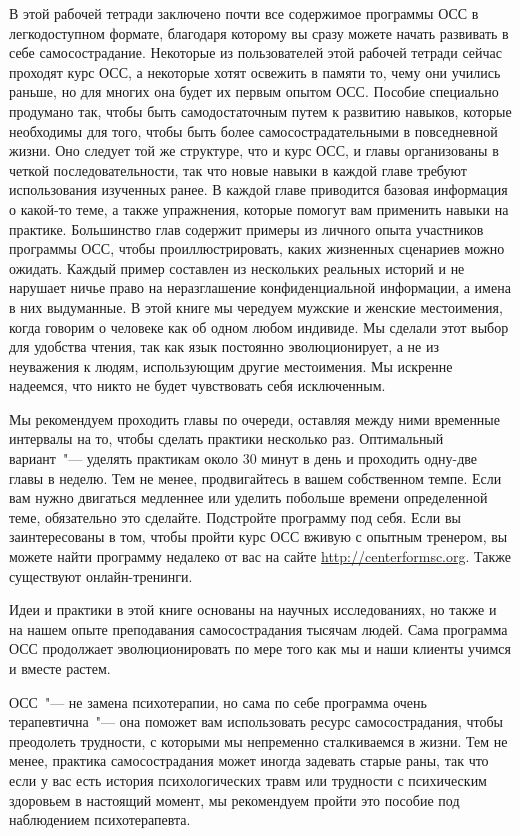 	В этой рабочей тетради заключено почти все содержимое программы ОСС в легкодоступном формате, благодаря которому вы сразу можете начать развивать в себе самосострадание. Некоторые из пользователей этой рабочей тетради сейчас проходят курс ОСС, а некоторые хотят освежить в памяти то, чему они учились раньше, но для многих она будет их первым опытом ОСС. Пособие специально продумано так, чтобы быть самодостаточным путем к развитию навыков, которые необходимы для того, чтобы быть более самосострадательными в повседневной жизни. Оно следует той же структуре, что и курс ОСС, и главы организованы в четкой последовательности, так что новые навыки в каждой главе требуют использования изученных ранее. В каждой главе приводится базовая информация о какой-то теме, а также упражнения, которые помогут вам применить навыки на практике. Большинство глав содержит примеры из личного опыта участников программы ОСС, чтобы проиллюстрировать, каких жизненных сценариев можно ожидать. Каждый пример составлен из нескольких реальных историй и не нарушает ничье право на неразглашение конфиденциальной информации, а имена в них выдуманные. В этой книге мы чередуем мужские и женские местоимения, когда говорим о человеке как об одном любом индивиде. Мы сделали этот выбор для удобства чтения, так как язык постоянно эволюционирует, а не из неуважения к людям, использующим другие местоимения. Мы искренне надеемся, что никто не будет чувствовать себя исключенным. 
	
	Мы рекомендуем проходить главы по очереди, оставляя между ними временные интервалы на то, чтобы сделать практики несколько раз. Оптимальный вариант~"--- уделять практикам около 30 минут в день и проходить одну-две главы в неделю. Тем не менее, продвигайтесь в вашем собственном темпе. Если вам нужно двигаться медленнее или уделить побольше времени определенной теме, обязательно это сделайте. Подстройте программу под себя. Если вы заинтересованы в том, чтобы пройти курс ОСС вживую с опытным тренером, вы можете найти программу недалеко от вас на сайте \url{http://centerformsc.org}. Также существуют онлайн-тренинги. 
	
	Идеи и практики в этой книге основаны на научных исследованиях, но также и на нашем опыте преподавания самосострадания тысячам людей. Сама программа ОСС продолжает эволюционировать по мере того как мы и наши клиенты учимся и вместе растем. 
	
	ОСС~"--- не замена психотерапии, но сама по себе программа очень терапевтична~"--- она поможет вам использовать ресурс самосострадания, чтобы преодолеть трудности, с которыми мы непременно сталкиваемся в жизни.  Тем не менее, практика самосострадания может иногда задевать старые раны, так что если у вас есть история психологических травм или трудности с психическим здоровьем в настоящий момент, мы рекомендуем пройти это пособие под наблюдением психотерапевта.
	
